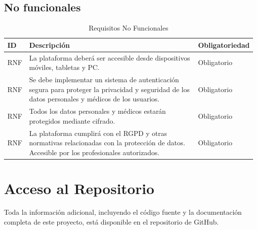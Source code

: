 \documentclass{article}
\begin{document}
\subsection{No funcionales}

\begin{table}[H]
	\centering
	\caption{Requisitos No Funcionales}
	\begin{tabular}{@{} p{2.5cm} p{6.5cm} p{3cm} @{}}
		\toprule
		\textbf{ID} & \textbf{Descripción} & \textbf{Obligatoriedad} \\
		\midrule
		\addlinespace
		\stepcounter{requisitosNoFuncionales} RNF\therequisitosNoFuncionales & La plataforma deberá ser accesible desde dispositivos móviles, tabletas y PC. & Obligatorio \\
		\addlinespace
		\stepcounter{requisitosNoFuncionales} RNF\therequisitosNoFuncionales & Se debe implementar un sistema de autenticación segura para proteger la privacidad y seguridad de los datos personales y médicos de los usuarios. & Obligatorio\\
			\stepcounter{requisitosNoFuncionales} RNF\therequisitosNoFuncionales & Todos los datos personales y médicos estarán protegidos mediante cifrado. & Obligatorio \\
		\addlinespace
		\stepcounter{requisitosNoFuncionales} RNF\therequisitosNoFuncionales &La plataforma cumplirá con el RGPD y otras normativas relacionadas con la protección de datos. Accesible por los profesionales autorizados. & Obligatorio \\
		\bottomrule
	\end{tabular}
\end{table}
	
	\section{Acceso al Repositorio}
	
	Toda la información adicional, incluyendo el código fuente y la documentación completa de este proyecto, está disponible en el repositorio de GitHub.
	
	
\end{document}
